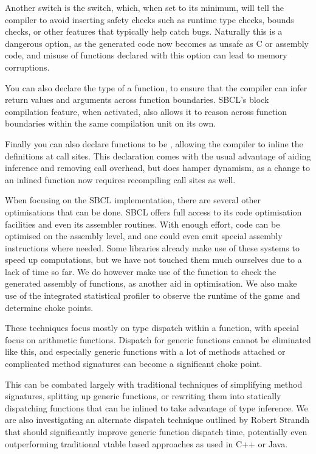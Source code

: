 \documentclass[a4paper]{paper}
\begin{document}
Another switch is the  switch, which, when set to its minimum, will tell the compiler to avoid inserting safety checks such as runtime type checks, bounds checks, or other features that typically help catch bugs. Naturally this is a dangerous option, as the generated code now becomes as unsafe as C or assembly code, and misuse of functions declared with this option can lead to memory corruptions.

You can also declare the type of a function, to ensure that the compiler can infer return values and arguments across function boundaries. SBCL's block compilation feature, when activated, also allows it to reason across function boundaries within the same compilation unit on its own.

Finally you can also declare functions to be , allowing the compiler to inline the definitions at call sites. This declaration comes with the usual advantage of aiding inference and removing call overhead, but does hamper dynamism, as a change to an inlined function now requires recompiling call sites as well.

When focusing on the SBCL implementation, there are several other optimisations that can be done. SBCL offers full access to its code optimisation facilities and even its assembler routines. With enough effort, code can be optimised on the assembly level, and one could even emit special assembly instructions where needed. Some libraries already make use of these systems to speed up computations, but we have not touched them much ourselves due to a lack of time so far. We do however make use of the  function to check the generated assembly of functions, as another aid in optimisation. We also make use of the integrated statistical profiler to observe the runtime of the game and determine choke points.

These techniques focus mostly on type dispatch within a function, with special focus on arithmetic functions. Dispatch for generic functions cannot be eliminated like this, and especially generic functions with a lot of methods attached or complicated method signatures can become a significant choke point.

This can be combated largely with traditional techniques of simplifying method signatures, splitting up generic functions, or rewriting them into statically dispatching functions that can be inlined to take advantage of type inference. We are also investigating an alternate dispatch technique outlined by Robert Strandh\cite{strandh2014fast} that should significantly improve generic function dispatch time, potentially even outperforming traditional vtable based approaches as used in C++ or Java.
\end{document}
